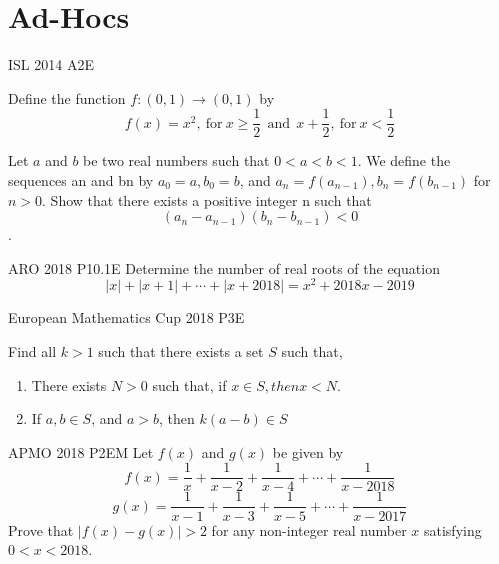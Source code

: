 \newpage\section{Ad-Hocs}


\prob{}
{ISL 2014 A2}{E}{
    Define the function $f : (0,1) \rightarrow (0,1)$ by 
    \[f(x)=x^2,\ \text{for}\ x\geq \frac{1}{2}\ \ \text{and}\ \
    x+\frac{1}{2},\ \text{for}\  x<\frac{1}{2}\]

    Let $a$ and $b$ be two real numbers such that $0 < a < b < 1$. We define
    the sequences an and bn by $a_0 = a, b_0 = b$, and $a_n = f(a_{n-1}), b_n
    = f(b_{n-1})$ for $n > 0$. Show that there exists a positive integer n
    such that \[(a_n-a_{n-1})(b_n-b_{n-1})<0\].
}



{ARO 2018 P10.1}{E}{
    Determine the number of real roots of the equation
    \[|x|+|x+1|+\cdots+|x+2018|=x^2+2018x-2019\]
}



{European Mathematics Cup 2018 P3}{E}{
    Find all $ k>1 $ such that there exists a set $ S $ such that,
    \begin{enumerate}
        \item There exists $ N>0 $ such that, if $ x\in S, then x<N $.
        \item If $ a, b \in S $, and $ a>b $, then $ k(a-b)\in S $
    \end{enumerate}
}



{APMO 2018 P2}{EM}{
    Let $f(x)$ and $g(x)$ be given by
    \[f(x) = \frac{1}{x} + \frac{1}{x-2} + \frac{1}{x-4} + \cdots + \frac{1}{x-2018}\]
    \[g(x) = \frac{1}{x-1} + \frac{1}{x-3} + \frac{1}{x-5} + \cdots + \frac{1}{x-2017}\]
    Prove that $|f(x)-g(x)| >2$ for any non-integer real number $x$ satisfying $0
    < x < 2018$.
}




